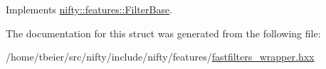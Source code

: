 Implements \hyperlink{structnifty_1_1features_1_1FilterBase_ab7d7de20b106e80ccfd65a818e1b6eef}{nifty\+::features\+::\+Filter\+Base}.



The documentation for this struct was generated from the following file\+:\begin{DoxyCompactItemize}
\item 
/home/tbeier/src/nifty/include/nifty/features/\hyperlink{fastfilters__wrapper_8hxx}{fastfilters\+\_\+wrapper.\+hxx}\end{DoxyCompactItemize}
